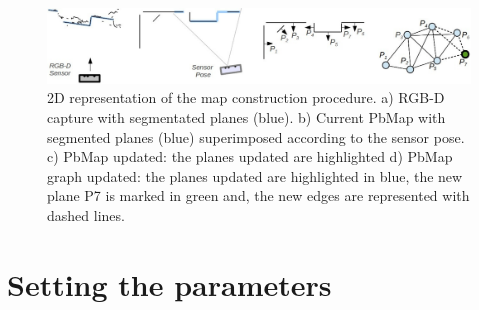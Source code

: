 \documentclass[a4paper,11pt]{article}
\begin{document}
\begin{figure}[t!]
  \centering
    \includegraphics[width=1.0\textwidth]{imgs/pbmap_construction.pdf}
  \caption{2D representation of the map construction procedure. a) RGB-D capture with segmentated planes (blue). b) Current PbMap with segmented planes (blue) superimposed according to the sensor pose. c) PbMap updated: the planes updated are highlighted d) PbMap graph updated: the planes updated are highlighted in blue, the new plane P7 is marked in green and, the new edges are represented with dashed lines.}
  \label{fig:pbmap_construction}
\end{figure}

%

\section{Setting the parameters}
\end{document}
